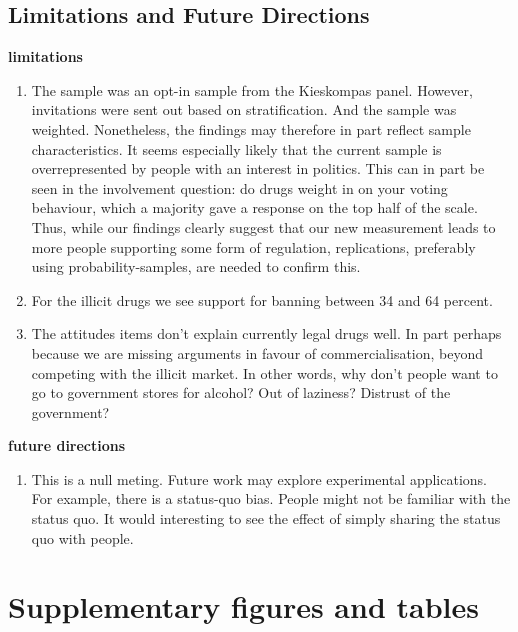 \documentclass[11pt,a4paper]{article}
\begin{document}
\subsection{Limitations and Future Directions}

\textbf{limitations}
\begin{enumerate}
    \item The sample was an opt-in sample from the Kieskompas panel. However, invitations were sent out based on stratification. And the sample was weighted. Nonetheless, the findings may therefore in part reflect sample characteristics. It seems especially likely that the current sample is overrepresented by people with an interest in politics. This can in part be seen in the involvement question: do drugs weight in on your voting behaviour, which a majority gave a response on the top half of the scale. Thus, while our findings clearly suggest that our new measurement leads to more people supporting some form of regulation, replications, preferably using probability-samples, are needed to confirm this. 
    \item For the illicit drugs we see support for banning between 34 and 64 percent.
    \item The attitudes items don't explain currently legal drugs well. In part perhaps because we are missing arguments in favour of commercialisation, beyond competing with the illicit market. In other words, why don't people want to go to government stores for alcohol? Out of laziness? Distrust of the government? 
\end{enumerate}


\textbf{future directions}
\begin{enumerate}
    \item This is a null meting. Future work may explore experimental applications. For example, there is a status-quo bias. People might not be familiar with the status quo. It would interesting to see the effect of simply sharing the status quo with people. 
\end{enumerate}



\printbibliography

\clearpage
\appendix

\section{Supplementary figures and tables}




\end{document}
